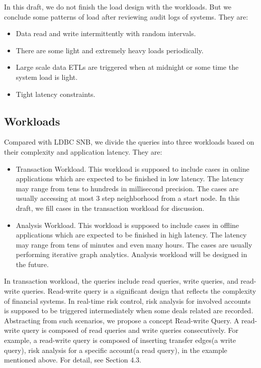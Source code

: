 In this draft, we do not finish the load design with the workloads. But we
conclude some patterns of load after reviewing audit logs of systems. They are:
\begin{itemize}
    \item Data read and write intermittently with random intervals.
    \item There are some light and extremely heavy loads periodically.
    \item Large scale data ETLs are triggered when at midnight or some time the
    system load is light.
    \item Tight latency constraints.
\end{itemize}

\subsection{Workloads}

Compared with LDBC SNB, we divide the queries into three workloads based on
their complexity and application latency. They are:
\begin{itemize}
    \item Transaction Workload. This workload is supposed to
    include cases in online applications which are expected to be finished in
    low latency. The latency may range from tens to hundreds in millisecond
    precision. The cases are usually accessing at most 3 step neighborhood from
    a start node. In this draft, we fill cases in the transaction workload for
    discussion.
    \item Analysis Workload. This workload is supposed to
    include cases in offline applications which are expected to be finished in
    high latency. The latency may range from tens of minutes and even many
    hours. The cases are usually performing iterative graph analytics. Analysis
    workload will be designed in the future.
\end{itemize}
In transaction workload, the queries include read queries, write queries, and
read-write queries. Read-write query is a significant design that reflects the
complexity of financial systems. In real-time risk control, risk analysis for
involved accounts is supposed to be triggered intermediately when some deals
related are recorded. Abstracting from such scenarios, we propose a concept
Read-write Query. A read-write query is composed of read queries and write
queries consecutively. For example, a read-write query is composed of inserting
transfer edges(a write query), risk analysis for a specific account(a read
query), in the example mentioned above. For detail, see Section 4.3.

